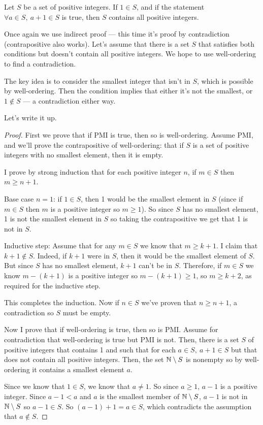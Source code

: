 Let $S$ be a set of positive integers. If $1\in S$, and if the statement
$\forall a\in S,\ a+1\in S$ is true, then $S$ contains all positive integers.

Once again we use indirect proof --- this time it's proof by contradiction
(contrapositive also works). Let's assume that there is a set $S$ that satisfies
both conditions but doesn't contain all positive integers. We hope to use
well-ordering to find a contradiction.

The key idea is to consider the smallest integer that isn't in $S$, which is
possible by well-ordering. Then the condition implies that either it's not the
smallest, or $1\not\in S$ --- a contradiction either way.

Let's write it up.
\begin{proof}
  First we prove that if PMI is true, then so is well-ordering. Assume PMI, and
  we'll prove the contrapositive of well-ordering: that if $S$ is a set of
  positive integers with no smallest element, then it is empty.

  I prove by strong induction that for each positive integer $n$, if $m\in S$
  then $m\ge n+1$.

  Base case $n=1$: if $1\in S$, then 1 would be the smallest element in $S$
  (since if $m\in S$ then $m$ is a positive integer so $m\ge 1$).
  So since $S$ has no smallest element, 1 is not the smallest element in $S$ so
  taking the contrapositive we get that 1 is not in $S$.

  Inductive step: Assume that for any $m\in S$ we know that $m\ge k+1$. I
  claim that $k+1\not\in S$. Indeed, if $k+1$ were in $S$, then it would be the
  smallest element of $S$. But since $S$ has no smallest element, $k+1$ can't be
  in $S$. Therefore, if $m\in S$ we know $m-(k+1)$ is a positive integer so
  $m-(k+1)\ge 1$, so $m\ge k+2$, as required for the inductive step.

  This completes the induction. Now if $n\in S$ we've proven that $n\ge n+1$, a
  contradiction so $S$ must be empty.

  Now I prove that if well-ordering is true, then so is PMI\@. Assume for
  contradiction that well-ordering is true but PMI is not. Then, there is a set
  $S$ of positive integers that contains 1 and such that for each $a\in S,\
  a+1\in S$ but that does not contain all positive integers. Then, the set
  $\mathbb{N}\setminus S$ is nonempty so by well-ordering it contains a smallest
  element $a$.

  Since we know that $1\in S$, we know that $a\ne 1$. So since $a\ge 1$,
  $a-1$ is a positive
  integer. Since $a-1<a$ and $a$ is the smallest member of $\mathbb{N}\setminus S$,
  $a-1$ is not in $\mathbb{N}\setminus S$ so $a-1\in S$. So $(a-1)+1=a\in S$,
  which contradicts the assumption that $a\not\in S$.
\end{proof}
